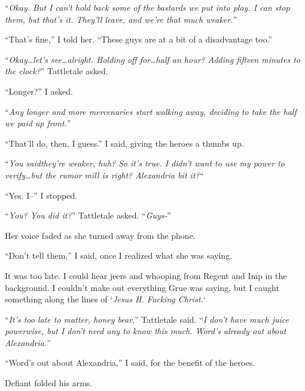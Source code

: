 ``\emph{Okay.  But I can't hold back some of the bastards we put into play.  I can stop them, but that's it.  They'll leave, and we're that much weaker.}''



``That's fine,'' I told her.  ``These guys are at a bit of a disadvantage too.''



``\emph{Okay\ldots let's see\ldots alright.  Holding off for\ldots half an hour?  Adding fifteen minutes to the clock?}'' Tattletale asked.



``Longer?'' I asked.



``\emph{Any longer and more mercenaries start walking away, deciding to take the half we paid up front.}''



``That'll do, then, I guess.''  I said, giving the heroes a thumbs up.



``\emph{You said}\emph{they're weaker, huh?  }\emph{So it's true.  I didn't want to use my power to verify\ldots but the rumor mill is right?  Alexandria bit it?}``



``Yes.  I--'' I stopped.



``\emph{You?  You did it?}''  Tattletale asked.  ``\emph{Guys-}''



Her voice faded as she turned away from the phone.



``Don't tell them,'' I said, once I realized what she was saying.



It was too late.  I could hear jeers and whooping from Regent and Imp in the background.  I couldn't make out everything Grue was saying, but I caught something along the lines of `\emph{Jesus H. Fucking Christ.}`



``\emph{It's too late to matter, honey bear},'' Tattletale said.  ``\emph{I don't have much juice powerwise, but I don't need any to know this much.  Word's already out about Alexandria.}''



``Word's out about Alexandria,'' I said, for the benefit of the heroes.



Defiant folded his arms.



